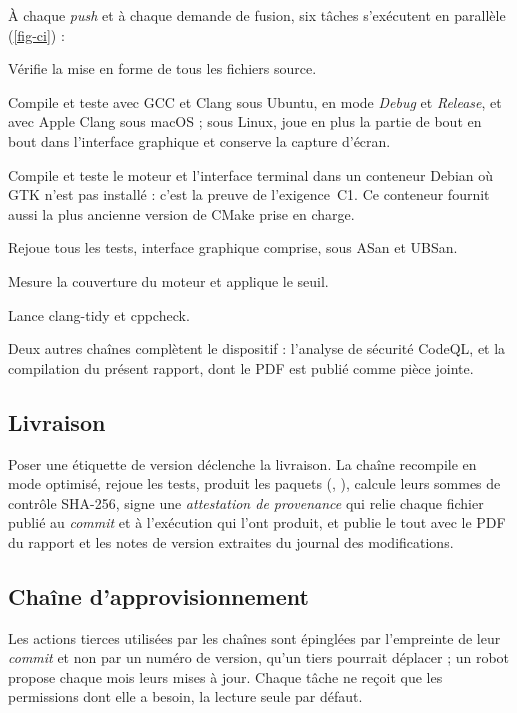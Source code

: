 À chaque \emph{push} et à chaque demande de fusion, six tâches s'exécutent en parallèle
(\cref{fig-ci}) :

\begin{description}[style=nextline, leftmargin=1.2em]
  \item[format] Vérifie la mise en forme de tous les fichiers source.
  \item[build] Compile et teste avec GCC et Clang sous Ubuntu, en mode \emph{Debug} et
    \emph{Release}, et avec Apple Clang sous macOS ; sous Linux, joue en plus la partie de
    bout en bout dans l'interface graphique et conserve la capture d'écran.
  \item[headless] Compile et teste le moteur et l'interface terminal dans un conteneur
    Debian où GTK n'est pas installé : c'est la preuve de l'exigence~C1. Ce conteneur
    fournit aussi la plus ancienne version de CMake prise en charge.
  \item[sanitizers] Rejoue tous les tests, interface graphique comprise, sous ASan et
    UBSan.
  \item[coverage] Mesure la couverture du moteur et applique le seuil.
  \item[lint] Lance clang-tidy et cppcheck.
\end{description}

Deux autres chaînes complètent le dispositif : l'analyse de sécurité CodeQL, et la
compilation du présent rapport, dont le PDF est publié comme pièce jointe.

\subsection{Livraison}

Poser une étiquette de version  déclenche la livraison. La chaîne recompile en
mode optimisé, rejoue les tests, produit les paquets (, ), calcule
leurs sommes de contrôle SHA-256, signe une \emph{attestation de provenance} qui relie
chaque fichier publié au \emph{commit} et à l'exécution qui l'ont produit, et publie le
tout avec le PDF du rapport et les notes de version extraites du journal des modifications.

\subsection{Chaîne d'approvisionnement}

Les actions tierces utilisées par les chaînes sont épinglées par l'empreinte de leur
\emph{commit} et non par un numéro de version, qu'un tiers pourrait déplacer ; un robot
propose chaque mois leurs mises à jour. Chaque tâche ne reçoit que les permissions dont elle
a besoin, la lecture seule par défaut.

